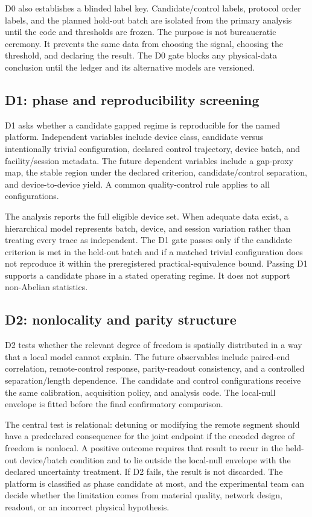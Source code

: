 \documentclass[conference]{IEEEtran}
\begin{document}
D0 also establishes a blinded label key. Candidate/control labels, protocol order labels, and the planned hold-out batch are isolated from the primary analysis until the code and thresholds are frozen. The purpose is not bureaucratic ceremony. It prevents the same data from choosing the signal, choosing the threshold, and declaring the result. The D0 gate blocks any physical-data conclusion until the ledger and its alternative models are versioned.

\subsection{D1: phase and reproducibility screening}

D1 asks whether a candidate gapped regime is reproducible for the named platform. Independent variables include device class, candidate versus intentionally trivial configuration, declared control trajectory, device batch, and facility/session metadata. The future dependent variables include a gap-proxy map, the stable region under the declared criterion, candidate/control separation, and device-to-device yield. A common quality-control rule applies to all configurations.

The analysis reports the full eligible device set. When adequate data exist, a hierarchical model represents batch, device, and session variation rather than treating every trace as independent. The D1 gate passes only if the candidate criterion is met in the held-out batch and if a matched trivial configuration does not reproduce it within the preregistered practical-equivalence bound. Passing D1 supports a candidate phase in a stated operating regime. It does not support non-Abelian statistics.

\subsection{D2: nonlocality and parity structure}

D2 tests whether the relevant degree of freedom is spatially distributed in a way that a local model cannot explain. The future observables include paired-end correlation, remote-control response, parity-readout consistency, and a controlled separation/length dependence. The candidate and control configurations receive the same calibration, acquisition policy, and analysis code. The local-null envelope is fitted before the final confirmatory comparison.

The central test is relational: detuning or modifying the remote segment should have a predeclared consequence for the joint endpoint if the encoded degree of freedom is nonlocal. A positive outcome requires that result to recur in the held-out device/batch condition and to lie outside the local-null envelope with the declared uncertainty treatment. If D2 fails, the result is not discarded. The platform is classified as phase candidate at most, and the experimental team can decide whether the limitation comes from material quality, network design, readout, or an incorrect physical hypothesis.
\end{document}
